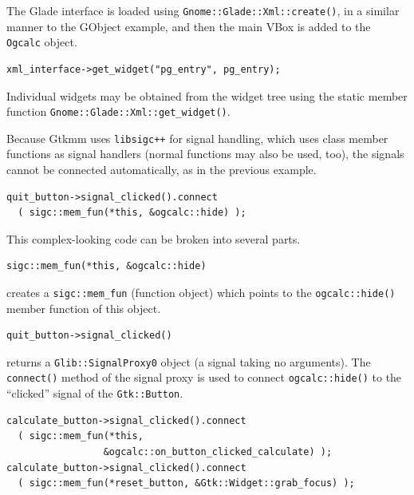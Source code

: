 \documentclass[a4paper,oneside]{article}
\newcommand{\program}[1]{\texttt{#1}}
\newcommand{\class}[1]{\texttt{#1}}
\newcommand{\function}[1]{\texttt{#1()}}
\begin{document}
The Glade interface is loaded using
\function{Gnome::Glade::Xml::create}, in a similar manner to the
GObject example, and then the main VBox is added to the \class{Ogcalc}
object.

\begin{lstlisting}[numbers=none, language={[GNU]C++}]
xml_interface->get_widget("pg_entry", pg_entry);
\end{lstlisting}

Individual widgets may be obtained from the widget tree using the
static member function \function{Gnome::Glade::Xml::get\_widget}.

Because Gtkmm uses \program{libsigc++} for signal handling, which uses
class member functions as signal handlers (normal functions may also
be used, too), the signals cannot be connected automatically, as in
the previous example.

\begin{lstlisting}[numbers=none, language={[GNU]C++}]
quit_button->signal_clicked().connect
  ( sigc::mem_fun(*this, &ogcalc::hide) );
\end{lstlisting}

This complex-looking code can be broken into several parts.

\begin{lstlisting}[numbers=none, language={[GNU]C++}]
sigc::mem_fun(*this, &ogcalc::hide)
\end{lstlisting}

\noindent creates a \class{sigc::mem\_fun} (function object) which points
to the \function{ogcalc::hide} member function of this object.

\begin{lstlisting}[numbers=none, language={[GNU]C++}]
quit_button->signal_clicked()
\end{lstlisting}

\noindent returns a \class{Glib::SignalProxy0} object (a signal taking no
arguments).  The \function{connect} method of the signal proxy is used
to connect \function{ogcalc::hide} to the ``clicked'' signal of the
\class{Gtk::Button}.

\begin{lstlisting}[numbers=none, language={[GNU]C++}]
calculate_button->signal_clicked().connect
  ( sigc::mem_fun(*this,
                 &ogcalc::on_button_clicked_calculate) );
calculate_button->signal_clicked().connect
  ( sigc::mem_fun(*reset_button, &Gtk::Widget::grab_focus) );
\end{lstlisting}
\end{document}
